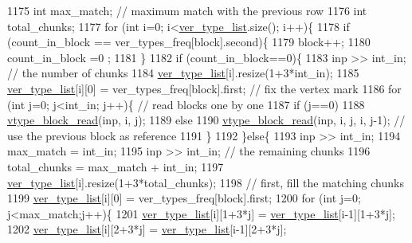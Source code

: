 \begin{DoxyCode}
1175   \textcolor{keywordtype}{int} max\_match; \textcolor{comment}{// maximum match with the previous row}
1176   \textcolor{keywordtype}{int} total\_chunks; 
1177   \textcolor{keywordflow}{for} (\textcolor{keywordtype}{int} i=0; i<\hyperlink{classmarked__graph__compressed_af2e3e55223d436628a02758dfae88493}{ver\_type\_list}.size(); i++)\{
1178     \textcolor{keywordflow}{if} (count\_in\_block == ver\_types\_freq[block].second)\{
1179       block++;
1180       count\_in\_block =0 ;
1181     \}
1182     \textcolor{keywordflow}{if} (count\_in\_block==0)\{
1183       inp >> int\_in; \textcolor{comment}{// the number of chunks}
1184       \hyperlink{classmarked__graph__compressed_af2e3e55223d436628a02758dfae88493}{ver\_type\_list}[i].resize(1+3*int\_in);
1185       \hyperlink{classmarked__graph__compressed_af2e3e55223d436628a02758dfae88493}{ver\_type\_list}[i][0] = ver\_types\_freq[block].first; \textcolor{comment}{// fix the vertex mark}
1186       \textcolor{keywordflow}{for} (\textcolor{keywordtype}{int} j=0; j<int\_in; j++)\{ \textcolor{comment}{// read blocks one by one}
1187         \textcolor{keywordflow}{if} (j==0)
1188           \hyperlink{classmarked__graph__compressed_a4bf8563a2dfd3038dc5833c014320487}{vtype\_block\_read}(inp, i, j);
1189         \textcolor{keywordflow}{else}
1190           \hyperlink{classmarked__graph__compressed_a4bf8563a2dfd3038dc5833c014320487}{vtype\_block\_read}(inp, i, j, i, j-1); \textcolor{comment}{// use the previous block as reference}
1191       \}
1192     \}\textcolor{keywordflow}{else}\{
1193       inp >> int\_in;
1194       max\_match = int\_in;
1195       inp >> int\_in; \textcolor{comment}{// the remaining chunks}
1196       total\_chunks = max\_match + int\_in; 
1197       \hyperlink{classmarked__graph__compressed_af2e3e55223d436628a02758dfae88493}{ver\_type\_list}[i].resize(1+3*total\_chunks);
1198       \textcolor{comment}{// first, fill the matching chunks}
1199       \hyperlink{classmarked__graph__compressed_af2e3e55223d436628a02758dfae88493}{ver\_type\_list}[i][0] = ver\_types\_freq[block].first;
1200       \textcolor{keywordflow}{for} (\textcolor{keywordtype}{int} j=0; j<max\_match;j++)\{
1201         \hyperlink{classmarked__graph__compressed_af2e3e55223d436628a02758dfae88493}{ver\_type\_list}[i][1+3*j] = \hyperlink{classmarked__graph__compressed_af2e3e55223d436628a02758dfae88493}{ver\_type\_list}[i-1][1+3*j];
1202         \hyperlink{classmarked__graph__compressed_af2e3e55223d436628a02758dfae88493}{ver\_type\_list}[i][2+3*j] = \hyperlink{classmarked__graph__compressed_af2e3e55223d436628a02758dfae88493}{ver\_type\_list}[i-1][2+3*j];

\end{DoxyCode}
